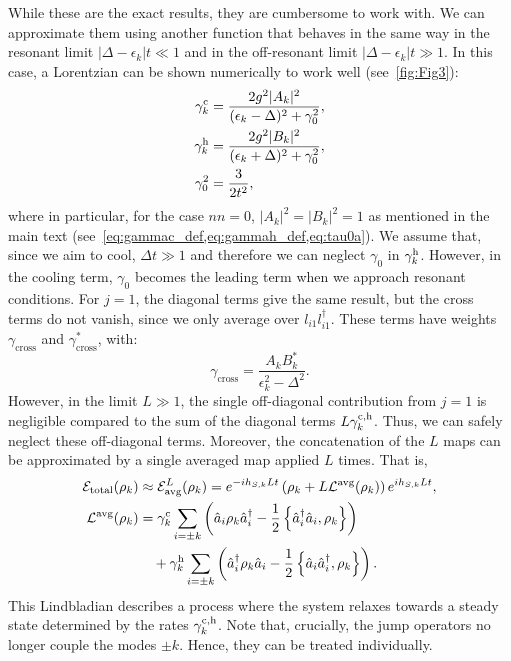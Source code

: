 While these are the exact results, they are cumbersome to work with. We can approximate them using another function that behaves in the same way in the resonant limit $|\Delta-\epsilon_k|t\ll 1$ and in the off-resonant limit $|\Delta-\epsilon_k|t\gg 1$. In this case, a Lorentzian can be shown numerically to work well (see~\cref{fig:Fig3}):
\begin{align}
    \gamma_k^{\rm c} &= \frac{2g^2|A_k|^2}{(\epsilon_k - \Delta)^2+\gamma_0^2},\\
    \gamma_k^{\rm h} &= \frac{2g^2|B_k|^2}{(\epsilon_k + \Delta)^2+\gamma_0^2},\\
    \gamma_0^2       &= \frac{3}{2t^2},
\end{align}
where in particular, for the case $nn=0$, $|A_k|^2=|B_k|^2=1$ as mentioned in the main text (see~\cref{eq:gammac_def,eq:gammah_def,eq:tau0a}). We assume that, since we aim to cool, $\Delta t\gg 1$ and therefore we can neglect $\gamma_0$ in $\gamma_k^{\rm h}$. However, in the cooling term, $\gamma_0$ becomes the leading term when we approach resonant conditions.
For $j=1$, the diagonal terms give the same result, but the cross terms do not vanish, since we only average over $l_{i1} l_{i1}^\dag$. These terms have weights $\gamma_\text{cross}$ and $\gamma^*_\text{cross}$, with:
\begin{equation}
    \gamma_\text{cross} = \frac{A_k B^*_k}{\epsilon_k^2 - \Delta^2}.
\end{equation}
However, in the limit $L \gg 1$, the single off-diagonal contribution from $j=1$ is negligible compared to the sum of the diagonal terms $L \gamma_k^{\rm c,h}$. Thus, we can safely neglect these off-diagonal terms. Moreover, the concatenation of the $L$ maps can be approximated by a single averaged map applied $L$ times. That is,
\begin{align}
    \mathcal{E}_{\text{total}}(\rho_k) &\approx \mathcal{E}_{\text{avg}}^L(\rho_k) = e^{-i h_{S,k} Lt} \left( \rho_k + L \mathcal{L}^\text{avg}(\rho_k) \right) e^{i h_{S,k} Lt},\\
    \mathcal{L}^\text{avg}(\rho_k)     &= \gamma_k^{\rm c} \sum_{i=\pm k} \left( \hat{a}_i \rho_k \hat{a}_i^\dag - \frac{1}{2} \left\{ \hat{a}_i^\dag \hat{a}_i, \rho_k \right\} \right)        \nonumber\\
                                       &\quad + \gamma_k^{\rm h} \sum_{i=\pm k} \left( \hat{a}_i^\dag \rho_k \hat{a}_i - \frac{1}{2} \left\{ \hat{a}_i \hat{a}_i^\dag, \rho_k \right\} \right).
    \label{eq:averaged_map}
\end{align}
This Lindbladian describes a process where the system relaxes towards a steady state determined by the rates $\gamma_k^{\rm c,h}$. Note that, crucially, the jump operators no longer couple the modes $\pm k$. Hence, they can be treated individually.


